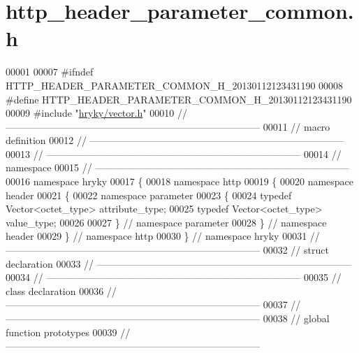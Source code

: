 \hypertarget{http__header__parameter__common_8h_source}{\section{http\-\_\-header\-\_\-parameter\-\_\-common.\-h}
}

\begin{DoxyCode}
00001 
00007 \textcolor{preprocessor}{#ifndef HTTP\_HEADER\_PARAMETER\_COMMON\_H\_20130112123431190}
00008 \textcolor{preprocessor}{}\textcolor{preprocessor}{#define HTTP\_HEADER\_PARAMETER\_COMMON\_H\_20130112123431190}
00009 \textcolor{preprocessor}{}\textcolor{preprocessor}{#include "\hyperlink{vector_8h}{hryky/vector.h}"}
00010 \textcolor{comment}{//
      ------------------------------------------------------------------------------}
00011 \textcolor{comment}{// macro definition}
00012 \textcolor{comment}{//
      ------------------------------------------------------------------------------}
00013 \textcolor{comment}{//
      ------------------------------------------------------------------------------}
00014 \textcolor{comment}{// namespace}
00015 \textcolor{comment}{//
      ------------------------------------------------------------------------------}
00016 \textcolor{keyword}{namespace }hryky
00017 \{
00018 \textcolor{keyword}{namespace }http
00019 \{
00020 \textcolor{keyword}{namespace }header
00021 \{
00022 \textcolor{keyword}{namespace }parameter
00023 \{
00024     \textcolor{keyword}{typedef} Vector<octet\_type> attribute\_type;
00025     \textcolor{keyword}{typedef} Vector<octet\_type> value\_type;
00026     
00027 \} \textcolor{comment}{// namespace parameter}
00028 \} \textcolor{comment}{// namespace header}
00029 \} \textcolor{comment}{// namespace http}
00030 \} \textcolor{comment}{// namespace hryky}
00031 \textcolor{comment}{//
      ------------------------------------------------------------------------------}
00032 \textcolor{comment}{// struct declaration}
00033 \textcolor{comment}{//
      ------------------------------------------------------------------------------}
00034 \textcolor{comment}{//
      ------------------------------------------------------------------------------}
00035 \textcolor{comment}{// class declaration}
00036 \textcolor{comment}{//
      ------------------------------------------------------------------------------}
00037 \textcolor{comment}{//
      ------------------------------------------------------------------------------}
00038 \textcolor{comment}{// global function prototypes}
00039 \textcolor{comment}{//
      ------------------------------------------------------------------------------}

\end{DoxyCode}
